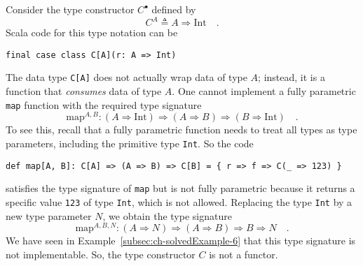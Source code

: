 Consider the type constructor $C^{\bullet}$ defined by
\[
C^{A}\triangleq A\Rightarrow\text{Int}\quad.
\]
Scala code for this type notation can be
\begin{lstlisting}
final case class C[A](r: A => Int)
\end{lstlisting}
The data type \lstinline!C[A]! does not actually wrap data of type
$A$; instead, it is a function that \emph{consumes} data of type
$A$. One cannot implement a fully parametric \lstinline!map! function
with the required type signature 
\[
\text{map}^{A,B}:\left(A\Rightarrow\text{Int}\right)\Rightarrow\left(A\Rightarrow B\right)\Rightarrow\left(B\Rightarrow\text{Int}\right)\quad.
\]
To see this, recall that a fully
parametric function needs to treat all types as type parameters, including
the primitive type \lstinline!Int!. So the code
\begin{lstlisting}
def map[A, B]: C[A] => (A => B) => C[B] = { r => f => C(_ => 123) }
\end{lstlisting}
satisfies the type signature of \lstinline!map! but is not fully
parametric because it returns a specific value \lstinline!123! of
type \lstinline!Int!, which is not allowed. Replacing the type \lstinline!Int!
by a new type parameter $N$, we obtain the type signature
\[
\text{map}^{A,B,N}:\left(A\Rightarrow N\right)\Rightarrow\left(A\Rightarrow B\right)\Rightarrow B\Rightarrow N\quad.
\]
We have seen in Example~\ref{subsec:ch-solvedExample-6} that this
type signature is not implementable. So, the type constructor $C$
is not a functor.


